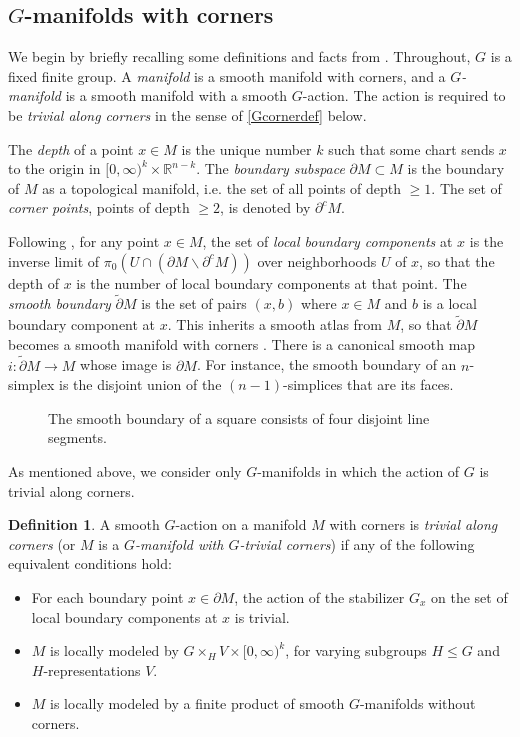 \documentclass[11pt]{amsart}
\theoremstyle{definition}
\newtheorem{defn}{Definition}[section]
\numberwithin{equation}{section}
\numberwithin{figure}{section}
\newcommand{\R}{\mathbb R}
\newcommand{\tipartial}{\widetilde\partial}
\newcommand{\ourdefn}[1]{{\it #1}}
\begin{document}
\subsection{$G$-manifolds with corners}\label{Gmanifolds} We begin by briefly recalling some definitions and facts from \cite{GIMM1}. Throughout, $G$ is a fixed finite group. A \ourdefn{manifold} %
is a smooth manifold with corners, and a \ourdefn{$G$-manifold} is a smooth manifold with a smooth $G$-action. The action is required to be \ourdefn{trivial along corners} in the sense of \autoref{Gcornerdef} below. 

The \ourdefn{depth} of a point $x \in M$ is the unique number $k$ such that some chart sends $x$ to the origin in $[0,\infty)^k \times \R^{n-k}$. The \ourdefn{boundary subspace} $\partial M \subset M$ is the boundary of $M$ as a topological manifold, i.e. the set of all points of depth $\geq 1$. The set of \ourdefn{corner points}, points of depth $\geq 2$, is denoted by $\partial^c M$.

Following \cite{joyce}, for any point $x\in M$, the set of \ourdefn{local boundary components} at $x$ is the inverse limit of $\pi_0(U\cap (\partial M\backslash \partial^c M))$ over neighborhoods $U$ of $x$, so that the depth of $x$ is the number of local boundary components at that point. The \ourdefn{smooth boundary} $\tipartial M$ is the set of pairs $(x,b)$ where $x \in M$ and $b$ is a local boundary component at $x$. This inherits a smooth atlas from $M$, so that $\tipartial M$ becomes a smooth manifold with corners \cite[Definition 2.7.]{joyce}. There is a canonical smooth map $i: \tipartial M\to M$ whose image is $\partial M$. 
For instance, the smooth boundary of an $n$-simplex is the disjoint union of the $(n-1)$-simplices that are its faces.

\begin{figure}[h]
	\centering
	
	\vspace{-.5em}
	\caption{The smooth boundary of a square consists of four disjoint line segments.}\label{fig:faces}
\end{figure}


As mentioned above, we consider only $G$-manifolds in which the action of $G$ is trivial along corners.

\begin{defn}\label{Gcornerdef}
A smooth $G$-action on a manifold $M$ with corners is \ourdefn{trivial along corners} (or $M$ is a \emph{$G$-manifold with $G$-trivial corners}) if any of the following equivalent conditions hold:
	\begin{itemize}	
		\item For each boundary point $x \in \partial M$, the action of the stabilizer $G_x$ on the set of local boundary components at $x$ is trivial.
		\item $M$ is locally modeled by $G \times_H V \times [0,\infty)^k$, for varying subgroups $H \leq G$ and $H$-representations $V$.
		\item $M$ is locally modeled by a finite product of smooth $G$-manifolds without corners.
	\end{itemize}
\end{defn}
\end{document}
